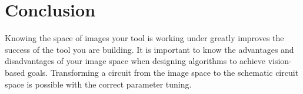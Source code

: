 \documentclass[10pt,twocolumn,letterpaper]{article}
\begin{document}
\section{Conclusion}

Knowing the space of images your tool is working under greatly improves the
success of the tool you are building. It is important to know the advantages
and disadvantages of your image space when designing algorithms to achieve
vision-based goals. Transforming a circuit from the image space to the
schematic circuit space is possible with the correct parameter tuning. 

{\small


}
\end{document}
